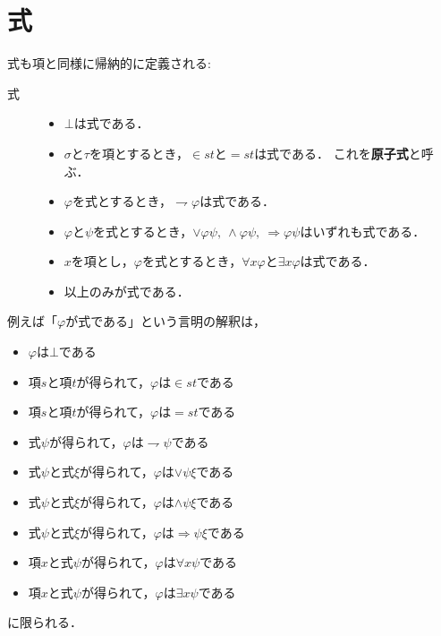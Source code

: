 \section{式}
	式も項と同様に帰納的に定義される:
	
	\begin{description}
		\item[式]
			\begin{itemize}
				\item $\bot$は式である．
				\item $\sigma$と$\tau$を項とするとき，$\in st$と$=st$は式である．
					これを{\bf 原子式}と呼ぶ．
				\item $\varphi$を式とするとき，$\rightharpoondown \varphi$は式である．
				\item $\varphi$と$\psi$を式とするとき，$\vee \varphi \psi,\ 
					\wedge \varphi \psi,\ \Longrightarrow \varphi \psi$はいずれも式である．
			
				\item $x$を項とし，$\varphi$を式とするとき，$\forall x \varphi$と$\exists x \varphi$は式である．
				
				\item 以上のみが式である．
			\end{itemize}
	\end{description}
	
	例えば「$\varphi$が式である」という言明の解釈は，
	\begin{itemize}
		\item $\varphi$は$\bot$である
		\item 項$s$と項$t$が得られて，$\varphi$は$\in s t$である
		\item 項$s$と項$t$が得られて，$\varphi$は$= s t$である
		\item 式$\psi$が得られて，$\varphi$は$\rightharpoondown \psi$である
		\item 式$\psi$と式$\xi$が得られて，$\varphi$は$\vee \psi \xi$である
		\item 式$\psi$と式$\xi$が得られて，$\varphi$は$\wedge \psi \xi$である
		\item 式$\psi$と式$\xi$が得られて，$\varphi$は$\Longrightarrow \psi \xi$である
		\item 項$x$と式$\psi$が得られて，$\varphi$は$\forall x \psi$である
		\item 項$x$と式$\psi$が得られて，$\varphi$は$\exists x \psi$である
	\end{itemize}
	に限られる．
	
